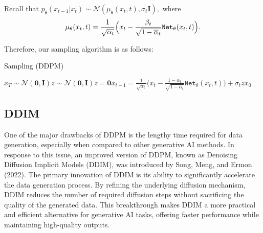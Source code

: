\documentclass[
]{article}
\theoremstyle{remark}
\begin{document}
Recall that
\(p_{\theta}(x_{t-1}\vert x_t)\sim \mathcal{N}(\mu_{\theta}(x_t,t),\sigma_t \mathbf{I}),\)
where \[
\begin{aligned}
  \mu_{\theta} (x_t,t) = \frac{1}{\sqrt{\alpha_t}} \Bigl( 
    x_t - \frac{\beta_t}{\sqrt{1-\overline{\alpha}_t}} \mathtt{Net}_{\theta} (x_t,t)
    \Bigr).
\end{aligned}
\]

Therefore, our sampling algorithm is as follows:

\begin{algorithm}[H]
\caption{Sampling (DDPM)}
\label{alg-diffusion-model-sampling-shortly}
\begin{algorithmic}[1]
\State $x_T\sim \mathcal{N}(\mathbf{0},\mathbf{I})$\State $z \sim \mathcal{N}(\mathbf{0},\mathbf{I})$\Else\State $z= \mathbf{0}$\EndIf\State $x_{t-1}=\frac{1}{\sqrt{\alpha_t}}\Big(x_t-\frac{1-\alpha_t}{\sqrt{1-\overline{\alpha}_t}}\mathtt{Net}_{\theta}(x_t,t)\Big)+\sigma_t z$\EndFor\Return $x_0$
\end{algorithmic}
\end{algorithm}

\subsection{DDIM}\label{sec-DDIM}

One of the major drawbacks of DDPM is the lengthy time required for data
generation, especially when compared to other generative AI methods. In
response to this issue, an improved version of DDPM, known as Denoising
Diffusion Implicit Models (DDIM), was introduced by Song, Meng, and
Ermon (2022). The primary innovation of DDIM is its ability to
significantly accelerate the data generation process. By refining the
underlying diffusion mechanism, DDIM reduces the number of required
diffusion steps without sacrificing the quality of the generated data.
This breakthrough makes DDIM a more practical and efficient alternative
for generative AI tasks, offering faster performance while maintaining
high-quality outputs.
\end{document}

